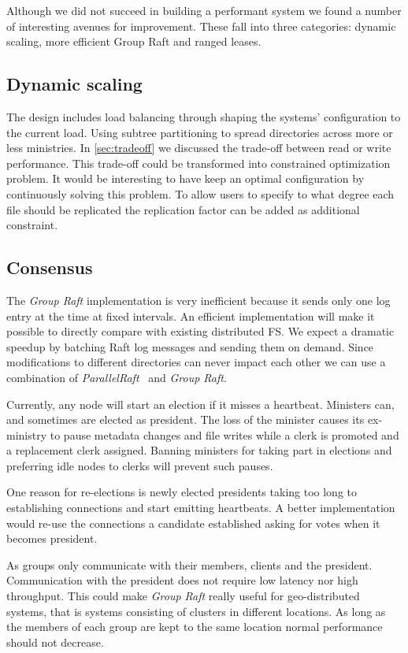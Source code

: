 Although we did not succeed in building a performant system we found a number of interesting avenues for improvement. These fall into three categories: dynamic scaling, more efficient Group Raft and ranged leases.

\subsection{Dynamic scaling}
The \name design includes load balancing through shaping the systems' configuration to the current load. Using subtree partitioning to spread directories across more or less ministries. In \cref{sec:tradeoff} we discussed the trade-off between read or write performance. This trade-off could be transformed into constrained optimization problem. It would be interesting to have \name{} keep an optimal configuration by continuously solving this problem. To allow users to specify to what degree each file should be replicated the replication factor can be added as additional constraint.

\subsection{Consensus}
The \textit{Group Raft} implementation is very inefficient because it sends only one log entry at the time at fixed intervals. An efficient implementation will make it possible to directly compare \name{} with existing distributed FS. We expect a dramatic speedup by batching Raft log messages and sending them on demand. Since modifications to different directories can never impact each other we can use a combination of \textit{ParallelRaft}~\cite{polarfs} and \textit{Group Raft}.

Currently, any node will start an election if it misses a heartbeat. Ministers can, and sometimes are elected as president. The loss of the minister causes its ex-ministry to pause metadata changes and file writes while a clerk is promoted and a replacement clerk assigned. Banning ministers for taking part in elections and preferring idle nodes to clerks will prevent such pauses.

One reason for re-elections is newly elected presidents taking too long to establishing connections and start emitting heartbeats. A better implementation would re-use the connections a candidate established asking for votes when it becomes president.

As groups only communicate with their members, clients and the president. Communication with the president does not require low latency nor high throughput. This could make \textit{Group Raft} really useful for geo-distributed systems, that is systems consisting of clusters in different locations. As long as the members of each group are kept to the same location normal performance should not decrease.

